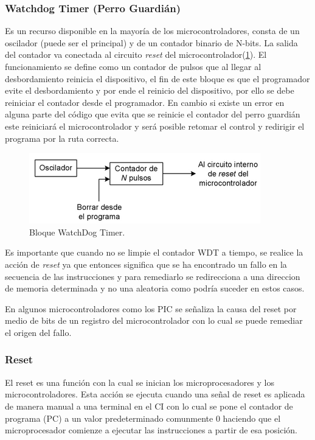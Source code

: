 \documentclass[letterpaper,12pt,oneside]{book}
\begin{document}
				\subsubsection{Watchdog Timer (Perro Guardián)}
				Es un recurso disponible en la mayoría de los microcontroladores, consta de un oscilador (puede ser el principal) y de un contador binario de N-bits. La salida del contador va conectada al circuito \textit{reset} del microcontrolador(\ref{BloqWDT}). El funcionamiento se define como un contador de pulsos que al llegar al desbordamiento reinicia el dispositivo, el fin de este bloque es que el programador evite el desbordamiento y por ende el reinicio del dispositivo, por ello se debe reiniciar el contador desde el programador. En cambio si existe un error en alguna parte del código que evita que se reinicie el contador del perro guardián este reiniciará el microcontrolador y será posible retomar el control y redirigir el programa por la ruta correcta.

				\begin{figure}[!htpb]
					\centering
					\includegraphics[scale = 1.0]{Material de Consulta/BloqWDT.PNG}
					\caption[Bloque WatchDog Timer]{Bloque WatchDog Timer.}
					\label{BloqWDT}
				\end{figure}

				Es importante que cuando no se limpie el contador WDT a tiempo, se realice la acción de \textit{reset} ya que entonces significa que se ha encontrado un fallo en la secuencia de las instrucciones y para remediarlo se redirecciona a una direccion de memoria determinada y no una aleatoria como podría suceder en estos casos.

				En algunos microcontroladores como los PIC se señaliza la causa del reset por medio de bits de un registro del microcontrolador con lo cual se puede remediar el origen del fallo.

				\subsubsection{Reset}
				El reset es una función con la cual se inician los microprocesadores y los microcontroladores. Esta acción se ejecuta cuando una señal de reset es aplicada de manera manual a una terminal en el CI con lo cual se pone el contador de programa (PC) a un valor predeterminado comunmente 0 haciendo que el microprocesador comienze a ejecutar las instrucciones a partir de esa posición.
\end{document}
